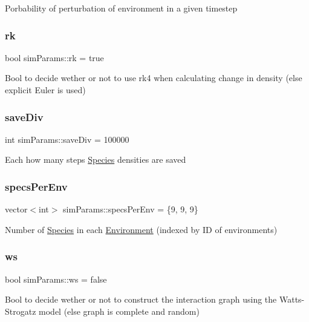 Porbability of perturbation of environment in a given timestep \mbox{\label{structsimParams_ab73f45f2fefc0df819177fac8ecbdb00}} 
\subsubsection{\texorpdfstring{rk}{rk}}
{\footnotesize\ttfamily bool sim\+Params\+::rk = true}

Bool to decide wether or not to use rk4 when calculating change in density (else explicit Euler is used) \mbox{\label{structsimParams_ad9fb5fcc3890d022270dbe00ec3a7c1e}} 
\subsubsection{\texorpdfstring{save\+Div}{saveDiv}}
{\footnotesize\ttfamily int sim\+Params\+::save\+Div = 100000}

Each how many steps \hyperlink{classSpecies}{Species} densities are saved \mbox{\label{structsimParams_aede5150c0b33bacae326638341a4e906}} 
\subsubsection{\texorpdfstring{specs\+Per\+Env}{specsPerEnv}}
{\footnotesize\ttfamily vector$<$int$>$ sim\+Params\+::specs\+Per\+Env = \{9, 9, 9\}}

Number of \hyperlink{classSpecies}{Species} in each \hyperlink{classEnvironment}{Environment} (indexed by ID of environments) \mbox{\label{structsimParams_ab704a8f270ac42b839d92c2c754bf359}} 
\subsubsection{\texorpdfstring{ws}{ws}}
{\footnotesize\ttfamily bool sim\+Params\+::ws = false}

Bool to decide wether or not to construct the interaction graph using the Watts-\/\+Strogatz model (else graph is complete and random) \mbox{\label{structsimParams_aa538c5bbac4966493cf3d847ef56906a}} 

